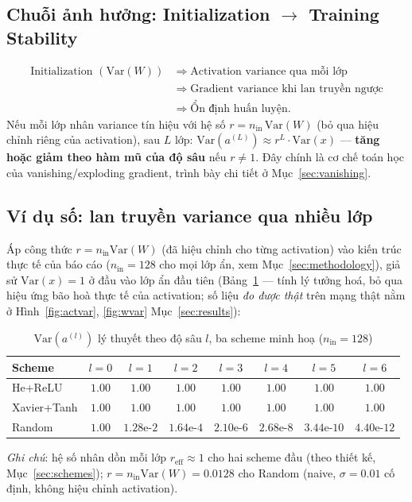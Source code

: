 \documentclass[12pt,a4paper]{article}
\begin{document}
\subsection{Chuỗi ảnh hưởng: Initialization $\to$ Training Stability}

\begin{align*}
\text{Initialization }(\mathrm{Var}(W)) \;&\Rightarrow\; \text{Activation variance qua mỗi lớp} \\
&\Rightarrow\; \text{Gradient variance khi lan truyền ngược} \\
&\Rightarrow\; \text{Ổn định huấn luyện.}
\end{align*}
Nếu mỗi lớp nhân variance tín hiệu với hệ số $r=n_{\text{in}}\,\mathrm{Var}(W)$
(bỏ qua hiệu chỉnh riêng của activation), sau $L$ lớp:
$\mathrm{Var}(a^{(L)}) \approx r^L\cdot\mathrm{Var}(x)$ --- \textbf{tăng
hoặc giảm theo hàm mũ của độ sâu} nếu $r\ne1$. Đây chính là cơ chế toán
học của vanishing/exploding gradient, trình bày chi tiết ở Mục~\ref{sec:vanishing}.

\subsection{Ví dụ số: lan truyền variance qua nhiều lớp}
\label{sec:varprop}

Áp công thức $r=n_{\text{in}}\mathrm{Var}(W)$ (đã hiệu chỉnh cho từng
activation) vào kiến trúc thực tế của báo cáo
($n_{\text{in}}=128$ cho mọi lớp ẩn, xem Mục~\ref{sec:methodology}),
giả sử $\mathrm{Var}(x)=1$ ở đầu vào lớp ẩn đầu tiên (Bảng~\ref{tab:varprop}
--- tính lý tưởng hoá, bỏ qua hiệu ứng bão hoà thực tế của activation;
số liệu \emph{đo được thật} trên mạng thật nằm ở Hình~\ref{fig:actvar},
\ref{fig:wvar} Mục~\ref{sec:results}):

\begin{table}[htbp]
\centering
\caption{$\mathrm{Var}(a^{(l)})$ lý thuyết theo độ sâu $l$, ba scheme minh hoạ ($n_{\text{in}}=128$)}
\footnotesize
\begin{tabular}{@{}lccccccc@{}}
\toprule
Scheme & $l{=}0$ & $l{=}1$ & $l{=}2$ & $l{=}3$ & $l{=}4$ & $l{=}5$ & $l{=}6$ \\
\midrule
He+ReLU & $1.00$ & $1.00$ & $1.00$ & $1.00$ & $1.00$ & $1.00$ & $1.00$ \\
Xavier+Tanh & $1.00$ & $1.00$ & $1.00$ & $1.00$ & $1.00$ & $1.00$ & $1.00$ \\
Random & $1.00$ & $1.28\text{e-}2$ & $1.64\text{e-}4$ & $2.10\text{e-}6$ & $2.68\text{e-}8$ & $3.44\text{e-}10$ & $4.40\text{e-}12$ \\
\bottomrule
\end{tabular}
\label{tab:varprop}
\end{table}
\emph{Ghi chú}: hệ số nhân dồn mỗi lớp $r_{\text{eff}}\approx1$ cho hai
scheme đầu (theo thiết kế, Mục~\ref{sec:schemes}); $r=n_{\text{in}}\mathrm{Var}(W)=0.0128$
cho Random (naive, $\sigma=0.01$ cố định, không hiệu chỉnh activation).
\end{document}
